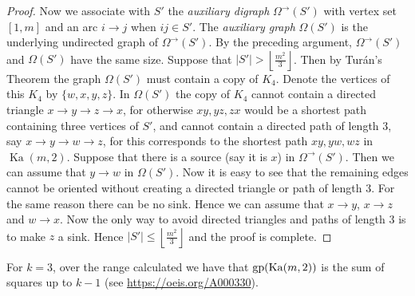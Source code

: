 \documentclass[a4paper,12pt]{article}
\theoremstyle{definition}
\newcommand{\gp}{{\rm gp}}
\DeclareMathOperator{\Ka}{Ka}
\begin{document}
\begin{proof}
		Now we associate with $S'$ the \emph{auxiliary digraph} $\Omega ^{\rightarrow }(S')$ with vertex set $[1,m]$ and an arc $i \rightarrow j$ when $ij \in S'$. The \emph{auxiliary graph} $\Omega (S')$ is the underlying undirected graph of $\Omega ^{\rightarrow }(S')$. By the preceding argument, $\Omega ^{\rightarrow }(S')$ and $\Omega (S')$ have the same size. Suppose that $|S'| > \left \lfloor \frac{m^2}{3} \right \rfloor $. Then by Tur\'{a}n's Theorem the graph $\Omega (S')$ must contain a copy of $K_4$. Denote the vertices of this $K_4$ by $\{ w,x,y,z\} $. In $\Omega (S')$ the copy of $K_4$ cannot contain a directed triangle $x \rightarrow y \rightarrow z \rightarrow x$, for otherwise $xy,yz,zx$ would be a shortest path containing three vertices of $S'$, and cannot contain a directed path of length 3, say $x \rightarrow y \rightarrow w \rightarrow z$, for this corresponds to the shortest path $xy,yw,wz$ in $\Ka (m,2)$. Suppose that there is a source (say it is $x$) in $\Omega ^{\rightarrow }(S')$. Then we can assume that $y \rightarrow w$ in $\Omega (S')$. Now it is easy to see that the remaining edges cannot be oriented without creating a directed triangle or path of length 3. For the same reason there can be no sink. Hence we can assume that $x \rightarrow y$, $x \rightarrow z$ and $w \rightarrow x$. Now the only way to avoid directed triangles and paths of length 3 is to make $z$ a sink. Hence $|S'| \leq \left \lfloor \frac{m^2}{3} \right \rfloor $ and the proof is complete. 
	\end{proof}
	
	For $k=3$, over the range calculated we have that $\gp(\Ka(m,2))$ is the sum of squares up to $k-1$ (see \url{https://oeis.org/A000330}). 
	
\end{document}
